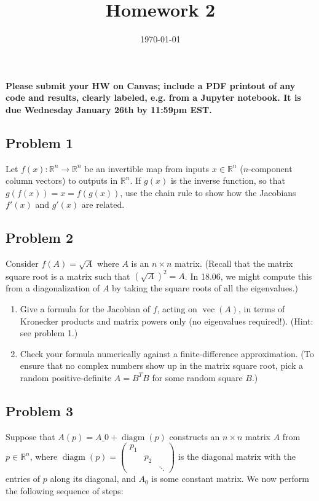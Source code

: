 \documentclass[10pt,oneside]{article}
\author{}
\title{Homework 2}
\date{\today}
\newcommand{\vecm}{\operatorname{vec}}
\newcommand{\diagm}{\operatorname{diagm}}
\begin{document}
\maketitle
\thispagestyle{fancy} 

{\bf Please submit your HW on Canvas; include a PDF printout of any code and results, clearly labeled, e.g. from a Jupyter notebook.  It is due Wednesday January 26th by 11:59pm EST.  }

\subsection*{Problem 1}

Let $f(x): \mathbb{R}^n \to \mathbb{R}^n$ be an invertible map from inputs $x \in \mathbb{R}^n$ ($n$-component column vectors) to outputs in $\mathbb{R}^n$.   If $g(x)$ is the inverse function, so that $g(f(x)) = x = f(g(x))$, use the chain rule to show how the Jacobians $f'(x)$ and $g'(x)$ are related.

\subsection*{Problem 2}

Consider $f(A) = \sqrt{A}$ where $A$ is an $n\times n$ matrix.   (Recall that the matrix square root is a matrix such that $(\sqrt{A})^2 = A$.   In 18.06, we might compute this from a diagonalization of $A$ by taking the square roots of all the eigenvalues.)

\begin{enumerate}[label=\alph*)]
    \item  Give a formula for the Jacobian of $f$, acting on $\vecm(A)$, in terms of Kronecker products and matrix powers only (no eigenvalues required!).  (Hint: see problem 1.)
    
    \item Check your formula numerically against a finite-difference approximation.  (To ensure that no complex numbers show up in the matrix square root, pick a random positive-definite $A = B^T B$ for some random square $B$.)
\end{enumerate}

\subsection*{Problem 3}

Suppose that $A(p) = A\_0 + \diagm(p)$ constructs an $n\times n$ matrix $A$ from $p \in \mathbb{R}^n$, where $\diagm(p) = \begin{pmatrix} p_1 & & \\ & p_2 & \\ & & \ddots \end{pmatrix}$ is the diagonal matrix with the entries of $p$ along its diagonal, and $A_0$ is some constant matrix.   We now perform the following sequence of steps:
\end{document}
